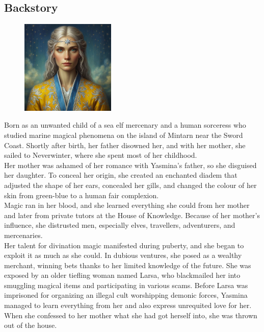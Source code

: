 \documentclass[10pt,twocolumn,twoside,openany,bg=full,layout=true,nomultitoc]{dndbook}
\begin{document}
\subsection{Backstory}\label{subsec:yasmina-backstory}
\begin{figure}
  \begin{center}
    \includegraphics[width=0.4\textwidth]{img/yasmina}
    \vspace{1cm}
  \end{center}
\end{figure}
Born as an unwanted child of a sea elf mercenary and a human sorceress who studied marine magical phenomena on the
island of Mintarn near the Sword Coast.
Shortly after birth, her father disowned her, and with her mother, she sailed
to Neverwinter, where she spent most of her childhood.\\
Her mother was ashamed of her romance with Yasmina's father, so she disguised her daughter.
To conceal her origin, she created an enchanted diadem that adjusted the shape of her ears, concealed her gills,
and changed the colour of her skin from green-blue to a human fair complexion.\\
Magic ran in her blood, and she learned everything she could from her mother and later from private tutors at the
House of Knowledge.
Because of her mother's influence, she distrusted men, especially elves, travellers, adventurers, and mercenaries.\\
Her talent for divination magic manifested during puberty, and she began to exploit it as much as she could.
In dubious ventures, she posed as a wealthy merchant, winning bets thanks to her limited knowledge of the future.
She was exposed by an older tiefling woman named Larsa, who blackmailed her into smuggling magical items and
participating in various scams.
Before Larsa was imprisoned for organizing an illegal cult worshipping demonic forces, Yasmina managed to learn
everything from her and also express unrequited love for her.
When she confessed to her mother what she had got herself into, she was thrown out of the house.\\
\end{document}
